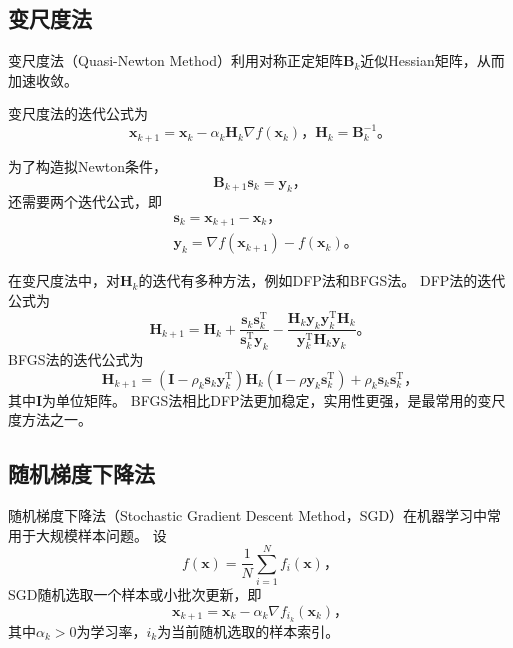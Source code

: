 \subsection{变尺度法}

变尺度法（Quasi-Newton Method）利用对称正定矩阵$\bm{B}_k$近似Hessian矩阵，从而加速收敛。

变尺度法的迭代公式为
\begin{equation*}
    \bm{x}_{k+1}=\bm{x}_k-\alpha_k\bm{H}_k\nabla f(\bm{x}_k) \text{，} \bm{H}_k=\bm{B}_k^{-1} \text{。}
\end{equation*}

为了构造拟Newton条件，
\begin{equation*}
    \bm{B}_{k+1}\bm{s}_{k}=\bm{y}_k \text{，}
\end{equation*}
还需要两个迭代公式，即
\begin{align*}
    &\bm{s}_k=\bm{x}_{k+1}-\bm{x}_k \text{，} \\
    &\bm{y}_k=\nabla f(\bm{x}_{k+1})-f(\bm{x}_k) \text{。}
\end{align*}

在变尺度法中，对$\bm{H}_k$的迭代有多种方法，例如DFP法和BFGS法。
DFP法的迭代公式为
\begin{equation*}
    \bm{H}_{k+1}=\bm{H}_k+\frac{\bm{s}_k\bm{s}_k^\mathrm{T}}{\bm{s}_k^\mathrm{T}\bm{y}_k}-\frac{\bm{H}_k\bm{y}_k\bm{y}_k^\mathrm{T}\bm{H}_k}{\bm{y}_k^\mathrm{T}\bm{H}_k\bm{y}_k} \text{。}
\end{equation*}
BFGS法的迭代公式为
\begin{equation*}
    \bm{H}_{k+1}=(\bm{I}-\rho_k\bm{s}_k\bm{y}_k^\mathrm{T})\bm{H}_k(\bm{I}-\rho\bm{y}_k\bm{s}_k^\mathrm{T})+\rho_k\bm{s}_k\bm{s}_k^\mathrm{T} \text{，}
\end{equation*}
其中$\bm{I}$为单位矩阵。
BFGS法相比DFP法更加稳定，实用性更强，是最常用的变尺度方法之一。

\subsection{随机梯度下降法}

随机梯度下降法（Stochastic Gradient Descent Method，SGD）在机器学习中常用于大规模样本问题。
设
\begin{equation*}
    f(\bm{x})=\frac{1}{N}\sum_{i=1}^Nf_i(\bm{x}) \text{，}
\end{equation*}
SGD随机选取一个样本或小批次更新，即
\begin{equation*}
    \bm{x}_{k+1}=\bm{x}_k-\alpha_k\nabla f_{i_k}(\bm{x}_k) \text{，}
\end{equation*}
其中$\alpha_k>0$为学习率，$i_k$为当前随机选取的样本索引。

